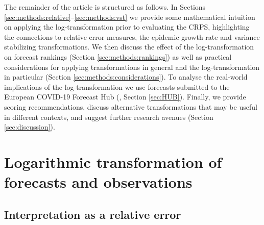 \documentclass[10pt,letterpaper]{article}
\begin{document}
The remainder of the article is structured as follows. In Sections \ref{sec:methods:relative}--\ref{sec:methods:vst} we provide some mathematical intuition on applying the log-transformation prior to evaluating the CRPS, highlighting the connections to relative error measures, the epidemic growth rate and variance stabilizing transformations.
We then discuss the effect of the log-transformation on forecast rankings (Section \ref{sec:methods:rankings}) as well as practical considerations for applying transformations in general and the log-transformation in particular (Section \ref{sec:methods:considerations}). To analyse the real-world implications of the log-transformation we use forecasts submitted to the European COVID-19 Forecast Hub  (\cite{europeancovid-19forecasthubEuropeanCovid19Forecast2021,sherrattPredictivePerformanceMultimodel2022}, Section \ref{sec:HUB}). Finally, we provide scoring recommendations, discuss alternative transformations that may be useful in different contexts, and suggest further research avenues (Section \ref{sec:discussion}). 


\section*{Logarithmic transformation of forecasts and observations}
\label{sec:methods}

\subsection*{Interpretation as a relative error}
\label{sec:methods:relative}
\end{document}
